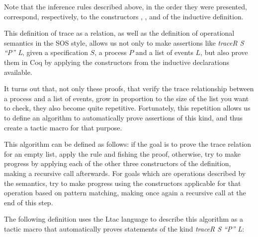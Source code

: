 Note that the inference rules described above, in the order they were presented, correspond, respectively, to the constructors  , , and  of the  inductive definition.

This definition of trace as a relation, as well as the definition of operational semantics in the SOS style, allows us not only to make assertions like \emph{traceR S ``P'' L}, given a specification $ S $, a process $ P $ and a list of events $ L $, but also prove them in Coq by applying the constructors from the inductive declarations available.

It turns out that, not only these proofs, that verify the trace relationship between a process and a list of events, grow in proportion to the size of the list you want to check, they also become quite repetitive. Fortunately, this repetition allows us to define an algorithm to automatically prove assertions of this kind, and thus create a tactic macro for that purpose.

This algorithm can be defined as follows: if the goal is to prove the trace relation for an empty list, apply the rule  and fishing the proof, otherwise, try to make progress by applying each of the other three constructors of the  definition, making a recursive call afterwards. For goals which are operations described by the \CSPcoq{} semantics, try to make progress using the constructors applicable for that operation based on pattern matching, making once again a recursive call at the end of this step.

The following definition uses the Ltac language to describe this algorithm as a tactic macro that automatically proves statements of the kind \emph{traceR S ``P'' L}:

